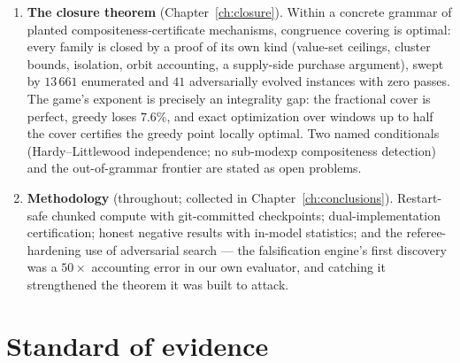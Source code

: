 \begin{enumerate}
  reduce sub-$100$-digit records to modular subset-sum with choices at
  density $\approx1.026$ and to CRT list decoding beyond the Johnson
  radius --- and practical lattice reduction measurably fails to
  penetrate that radius even on solution-abundant instances. Sub-$100$
  digits is costed at $\sim$$9\cdot10^5$ GPU-years by the only viable
  route.
\item \textbf{The closure theorem} (Chapter~\ref{ch:closure}). Within a
  concrete grammar of planted compositeness-certificate mechanisms,
  congruence covering is optimal: every family is closed by a proof of
  its own kind (value-set ceilings, cluster bounds, isolation, orbit
  accounting, a supply-side purchase argument), swept by $13\,661$
  enumerated and $41$ adversarially evolved instances with zero passes.
  The game's exponent is precisely an integrality gap: the fractional
  cover is perfect, greedy loses $7.6\%$, and exact optimization over
  windows up to half the cover certifies the greedy point locally
  optimal. Two named conditionals (Hardy--Littlewood independence; no
  sub-modexp compositeness detection) and the out-of-grammar frontier
  are stated as open problems.
\item \textbf{Methodology} (throughout; collected in
  Chapter~\ref{ch:conclusions}). Restart-safe chunked compute with
  git-committed checkpoints; dual-implementation certification; honest
  negative results with in-model statistics; and the referee-hardening
  use of adversarial search --- the falsification engine's first
  discovery was a $50\times$ accounting error in our own evaluator, and
  catching it strengthened the theorem it was built to attack.
\end{enumerate}

\section{Standard of evidence}

